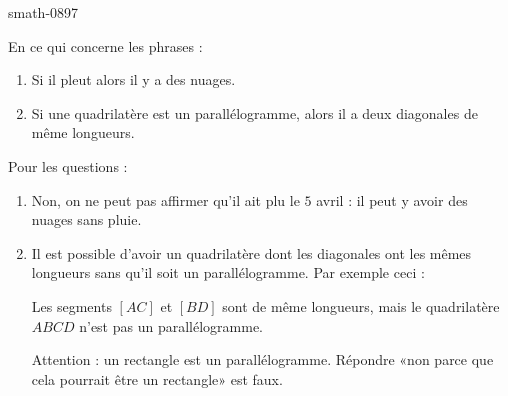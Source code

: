 
\begin{corrige}{smath-0897}

    En ce qui concerne les phrases :
    \begin{enumerate}
        \item
            Si il pleut alors il y a des nuages.
        \item
            Si une quadrilatère est un parallélogramme, alors il a deux diagonales de même longueurs.
    \end{enumerate}
    Pour les questions :
    \begin{enumerate}
        \item
            Non, on ne peut pas affirmer qu'il ait plu le \( 5\) avril : il peut y avoir des nuages sans pluie.
        \item
            Il est possible d'avoir un quadrilatère dont les diagonales ont les mêmes longueurs sans qu'il soit un parallélogramme. Par exemple ceci :
\begin{center}
   
\end{center}
Les segments \( [AC]\) et \( [BD]\) sont de même longueurs, mais le quadrilatère \( ABCD\) n'est pas un parallélogramme.

        Attention : un rectangle est un parallélogramme. Répondre «non parce que cela pourrait être un rectangle» est faux.

    \end{enumerate}

\end{corrige}
